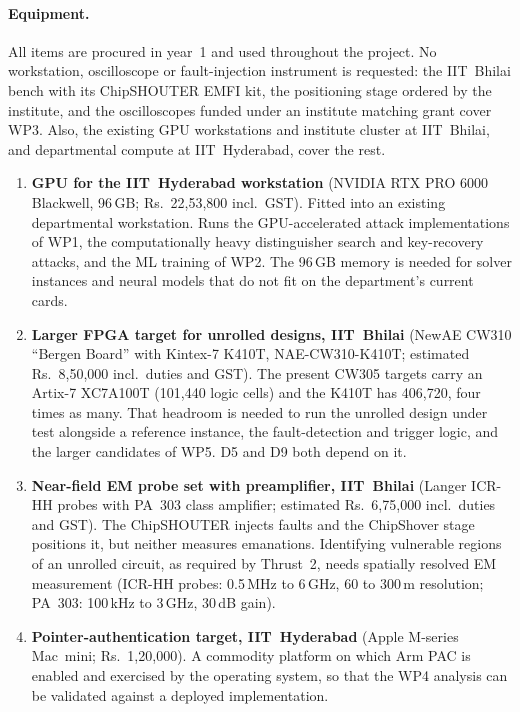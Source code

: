 \paragraph{Equipment.}
All items are procured in year~1 and used throughout the project.
No workstation, oscilloscope or fault-injection instrument is requested: the IIT~Bhilai bench with its ChipSHOUTER EMFI kit, the positioning stage ordered by the institute, and the oscilloscopes funded under an institute matching grant cover WP3. Also, the existing GPU workstations and institute cluster at IIT~Bhilai, and departmental compute at IIT~Hyderabad, cover the rest.
\begin{enumerate}[label=\textbf{E\arabic*.}, leftmargin=*, itemsep=1pt]
  \item \textbf{GPU for the IIT~Hyderabad workstation} (NVIDIA RTX PRO 6000 Blackwell, 96\,GB; Rs.~22,53,800 incl.\ GST).
        Fitted into an existing departmental workstation.
        Runs the GPU-accelerated attack implementations of WP1, the computationally heavy distinguisher search and key-recovery attacks, and the ML training of WP2. The 96\,GB memory is needed for solver instances and neural models that do not fit on the department's current cards.
  \item \textbf{Larger FPGA target for unrolled designs, IIT~Bhilai} (NewAE CW310 ``Bergen Board'' with Kintex-7 K410T, NAE-CW310-K410T; estimated Rs.~8,50,000 incl.\ duties and GST).
        The present CW305 targets carry an Artix-7 XC7A100T (101,440 logic cells) and the K410T has 406,720, four times as many.
        That headroom is needed to run the unrolled design under test alongside a reference instance, the fault-detection and trigger logic, and the larger  candidates of WP5. D5 and D9 both depend on it.
  \item \textbf{Near-field EM probe set with preamplifier, IIT~Bhilai} (Langer ICR-HH probes with PA~303 class amplifier; estimated Rs.~6,75,000 incl.\ duties and GST).
        The ChipSHOUTER injects faults and the ChipShover stage positions it, but neither measures emanations. Identifying vulnerable regions of an unrolled circuit, as required by Thrust~2, needs spatially resolved EM measurement (ICR-HH probes: 0.5\,MHz to 6\,GHz, 60 to 300\,\textmu m resolution; PA~303: 100\,kHz to 3\,GHz, 30\,dB gain).
  \item \textbf{Pointer-authentication target, IIT~Hyderabad} (Apple M-series Mac~mini; Rs.~1,20,000).
        A commodity platform on which Arm PAC is enabled and exercised by the operating system, so that the WP4 analysis can be validated against a deployed implementation.

\end{enumerate}
